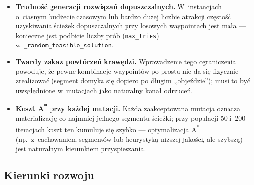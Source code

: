 \begin{itemize}
    \item \textbf{Trudność generacji rozwiązań dopuszczalnych.} W~instancjach
          o~ciasnym budżecie czasowym lub bardzo dużej liczbie atrakcji
          częstość uzyskiwania ścieżek dopuszczalnych przy losowych
          waypointach jest mała --- konieczne jest podbicie liczby prób
          (\texttt{max\_tries}) w~\texttt{\_random\_feasible\_solution}.
    \item \textbf{Twardy zakaz powtórzeń krawędzi.} Wprowadzenie tego
          ograniczenia powoduje, że pewne kombinacje waypointów po prostu
          nie da się fizycznie zrealizować (segment domyka się dopiero
          po długim ,,objeździe''); musi to być uwzględnione w~mutacjach
          jako naturalny kanał odrzuceń.
    \item \textbf{Koszt A\textsuperscript{*} przy każdej mutacji.}
          Każda zaakceptowana mutacja oznacza materializację co najmniej
          jednego segmentu ścieżki; przy populacji 50 i~200 iteracjach
          koszt ten kumuluje się szybko --- optymalizacja A\textsuperscript{*}
          (np.\ z~cachowaniem segmentów lub heurystyką niższej jakości,
          ale szybszą) jest naturalnym kierunkiem przyspieszania.
\end{itemize}

\subsection{Kierunki rozwoju}


